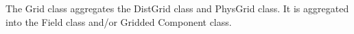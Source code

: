 %


The Grid class aggregates the DistGrid class and PhysGrid class.  It is 
aggregated into the Field class and/or Gridded Component class.
